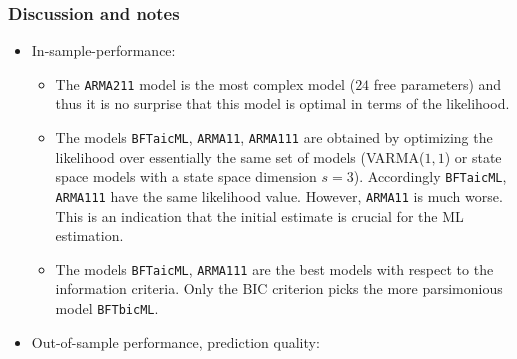 \documentclass[]{article}
\providecommand{\tightlist}{%
  \setlength{\itemsep}{0pt}\setlength{\parskip}{0pt}}
\begin{document}
\subsubsection{Discussion and notes}\label{discussion-and-notes}

\begin{itemize}
\tightlist
\item
  In-sample-performance:

  \begin{itemize}
  \tightlist
  \item
    The \texttt{ARMA211} model is the most complex model (\(24\) free
    parameters) and thus it is no surprise that this model is optimal in
    terms of the likelihood.
  \item
    The models \texttt{BFTaicML}, \texttt{ARMA11}, \texttt{ARMA111} are
    obtained by optimizing the likelihood over essentially the same set
    of models (VARMA(\(1,1\)) or state space models with a state space
    dimension \(s=3\)). Accordingly \texttt{BFTaicML}, \texttt{ARMA111}
    have the same likelihood value. However, \texttt{ARMA11} is much
    worse. This is an indication that the initial estimate is crucial
    for the ML estimation.
  \item
    The models \texttt{BFTaicML}, \texttt{ARMA111} are the best models
    with respect to the information criteria. Only the BIC criterion
    picks the more parsimonious model \texttt{BFTbicML}.
  \end{itemize}
\item
  Out-of-sample performance, prediction quality:


\end{itemize}
\end{document}
